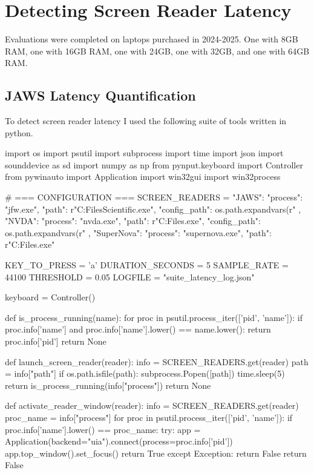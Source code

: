 \chapter{Detecting Screen Reader Latency}\label{chap:computationappendix}

Evaluations were completed on laptops purchased in 2024-2025. One with 8GB RAM, one with 16GB RAM, one with 24GB, one with 32GB, and one with 64GB RAM. 

\section{JAWS Latency Quantification}
To detect screen reader latency I used the following suite of tools written in python.

\begin{pyverbatim}
import os
import psutil
import subprocess
import time
import json
import sounddevice as sd
import numpy as np
from pynput.keyboard import Controller
from pywinauto import Application
import win32gui
import win32process

# === CONFIGURATION ===
SCREEN_READERS = {
    "JAWS": {
        "process": "jfw.exe",
        "path": r"C:\Program Files\Freedom Scientific\JAWS{}\jfw.exe",
        "config_path": os.path.expandvars(r"%
    },
    "NVDA": {
        "process": "nvda.exe",
        "path": r"C:\Program Files\NVDA\nvda.exe",
        "config_path": os.path.expandvars(r"%
    },
    "SuperNova": {
        "process": "supernova.exe",
        "path": r"C:\Program Files\Dolphin\SuperNova\supernova.exe"
    }
}

KEY_TO_PRESS = 'a'
DURATION_SECONDS = 5
SAMPLE_RATE = 44100
THRESHOLD = 0.05
LOGFILE = "suite_latency_log.json"

keyboard = Controller()

def is_process_running(name):
    for proc in psutil.process_iter(['pid', 'name']):
        if proc.info['name'] and proc.info['name'].lower() == name.lower():
            return proc.info['pid']
    return None

def launch_screen_reader(reader):
    info = SCREEN_READERS.get(reader)
    path = info["path"]
    if os.path.isfile(path):
        subprocess.Popen([path])
        time.sleep(5)
        return is_process_running(info["process"])
    return None

def activate_reader_window(reader):
    info = SCREEN_READERS.get(reader)
    proc_name = info["process"]
    for proc in psutil.process_iter(['pid', 'name']):
        if proc.info['name'].lower() == proc_name:
            try:
                app = Application(backend="uia").connect(process=proc.info['pid'])
                app.top_window().set_focus()
                return True
            except Exception:
                return False
    return False


\end{pyverbatim}
